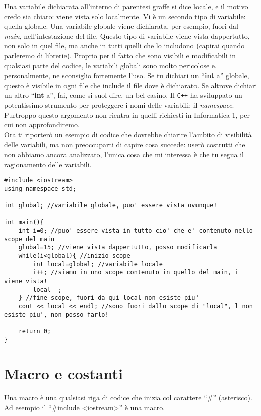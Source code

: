 	Una variabile dichiarata all'interno di parentesi graffe si dice locale, e il motivo credo sia chiaro: viene vista solo localmente. Vi è un secondo tipo di variabile: quella globale. Una variabile globale viene dichiarata, per esempio, fuori dal \emph{main}, nell'intestazione del file. Questo tipo di variabile viene vista dappertutto, non solo in quel file, ma anche in tutti quelli che lo includono (capirai quando parleremo di librerie). Proprio per il fatto che sono visibili e modificabili in qualsiasi parte del codice, le variabili globali sono molto pericolose e, personalmente, ne sconsiglio fortemente l'uso. Se tu dichiari un ``\textbf{int} a'' globale, questo è visibile in ogni file che include il file dove è dichiarato. Se altrove dichiari un altro ``\textbf{int} a'', fai, come si suol dire, un bel casino. Il \verb|C++| ha sviluppato un potentissimo strumento per proteggere i nomi delle variabili: il \emph{namespace}. Purtroppo questo argomento non rientra in quelli richiesti in Informatica 1, per cui non approfondiremo.
	\\
	
	Ora ti riporterò un esempio di codice che dovrebbe chiarire l'ambito di visibilità delle variabili, ma non preoccuparti di capire cosa succede: userò costrutti che non abbiamo ancora analizzato, l'unica cosa che mi interessa è che tu segua il ragionamento delle variabili. 
	
	\begin{lstlisting}
#include <iostream>
using namespace std;

int global; //variabile globale, puo' essere vista ovunque!

int main(){
	int i=0; //puo' essere vista in tutto cio' che e' contenuto nello scope del main	
	global=15; //viene vista dappertutto, posso modificarla
	while(i<global){ //inizio scope
		int local=global; //variabile locale
		i++; //siamo in uno scope contenuto in quello del main, i viene vista!
		local--;
	} //fine scope, fuori da qui local non esiste piu'
	cout << local << endl; //sono fuori dallo scope di "local", l non esiste piu', non posso farlo!
		
	return 0;
}
	\end{lstlisting}
	\section{Macro e costanti}
	Una macro è una qualsiasi riga di codice che inizia col carattere ``\#'' (asterisco). Ad esempio il ``\#include <iostream>'' è una macro. 
	
